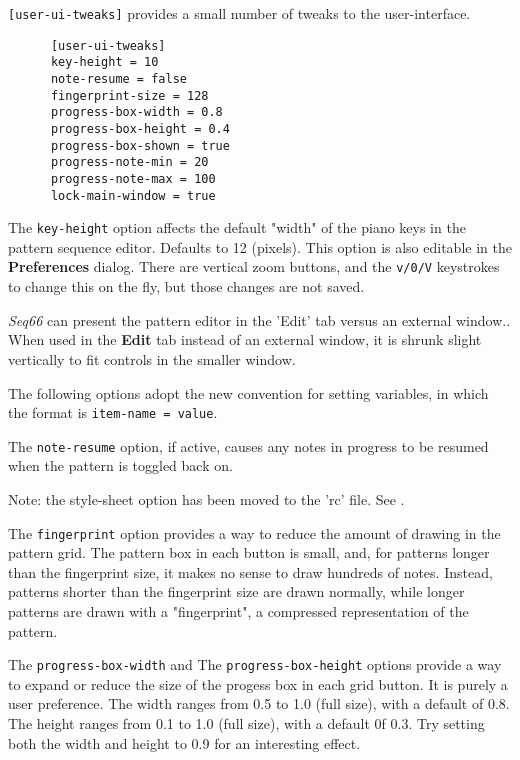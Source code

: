    \texttt{[user-ui-tweaks]} provides a small number of tweaks to the
   user-interface.

   \begin{verbatim}
      [user-ui-tweaks]
      key-height = 10
      note-resume = false
      fingerprint-size = 128
      progress-box-width = 0.8
      progress-box-height = 0.4
      progress-box-shown = true
      progress-note-min = 20
      progress-note-max = 100
      lock-main-window = true
   \end{verbatim}


   The \texttt{key-height} option
   affects the default "width" of the piano keys in the pattern
   sequence editor.  Defaults to 12 (pixels).
   This option is also editable in the \textbf{Preferences} dialog.
   There are vertical zoom buttons, and the \texttt{v/0/V} keystrokes to change
   this on the fly, but those changes are not saved.

   \textsl{Seq66} can present the pattern editor in the 'Edit' tab
   versus an external window..
   When used in the \textbf{Edit} tab instead of an external window,
   it is shrunk slight vertically to fit controls in the smaller window.

   The following options adopt the new convention for setting variables, in
   which the format is \texttt{item-name = value}.

   The \texttt{note-resume} option, if active, causes any notes in progress
   to be resumed when the pattern is toggled back on.

   Note: the style-sheet option has been moved to the 'rc' file.
   See .

   The \texttt{fingerprint} option provides a way to reduce the amount of
   drawing in the pattern grid.  The pattern box in each button is small, and,
   for patterns longer than the fingerprint size, it makes no sense to draw
   hundreds of notes.  Instead, patterns shorter than the fingerprint size are
   drawn normally, while longer patterns are drawn with a "fingerprint", a
   compressed representation of the pattern.

   The \texttt{progress-box-width} and
   The \texttt{progress-box-height} options provide a way to expand or reduce
   the size of the progess box in each grid button.
   It is purely a user preference.
   The width ranges from 0.5 to 1.0 (full size), with a default of 0.8.
   The height ranges from 0.1 to 1.0 (full size), with a default 0f 0.3.
   Try setting both the width and height to 0.9 for an interesting effect.

